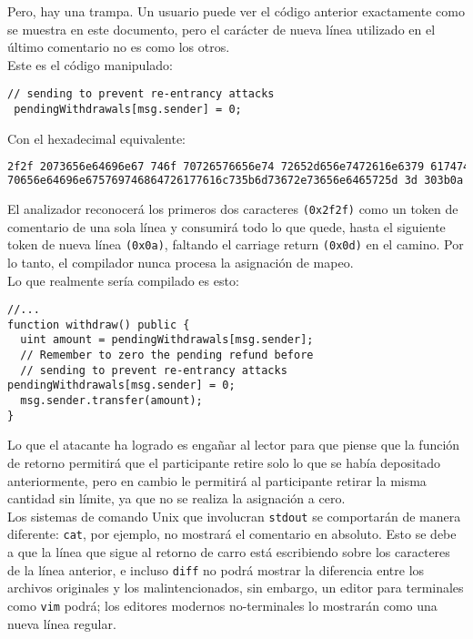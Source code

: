 Pero, hay una trampa. Un usuario puede ver el código anterior exactamente como se muestra en este documento, pero el carácter de nueva línea utilizado en el último comentario no es como los otros.\\

Este es el código manipulado:
\begin{lstlisting}[language=Solidity]
// sending to prevent re-entrancy attacks
 pendingWithdrawals[msg.sender] = 0;
\end{lstlisting}

Con el hexadecimal equivalente:
\begin{lstlisting}[language=bash]
2f2f 2073656e64696e67 746f 70726576656e74 72652d656e7472616e6379 61747461636b730d
70656e64696e675769746864726177616c735b6d73672e73656e6465725d 3d 303b0a
\end{lstlisting}

El analizador reconocerá los primeros dos caracteres \verb|(0x2f2f)| como un token de comentario de una sola línea y consumirá todo lo que quede, hasta el siguiente token de nueva línea \verb|(0x0a)|, faltando el carriage return \verb|(0x0d)| en el camino. Por lo tanto, el compilador nunca procesa la asignación de mapeo.\\

Lo que realmente sería compilado es esto:
\begin{lstlisting}[language=Solidity]
//...
function withdraw() public {
  uint amount = pendingWithdrawals[msg.sender];
  // Remember to zero the pending refund before
  // sending to prevent re-entrancy attacks pendingWithdrawals[msg.sender] = 0;
  msg.sender.transfer(amount);   
}
\end{lstlisting}

Lo que el atacante ha logrado es engañar al lector para que piense que la función de retorno permitirá que el participante retire solo lo que se había depositado anteriormente, pero en cambio le permitirá al participante retirar la misma cantidad sin límite, ya que no se realiza la asignación a cero.\\

Los sistemas de comando Unix que involucran \verb|stdout| se comportarán de manera diferente: \verb|cat|, por ejemplo, no mostrará el comentario en absoluto. Esto se debe a que la línea que sigue al retorno de carro está escribiendo sobre los caracteres de la línea anterior, e incluso \verb|diff| no podrá mostrar la diferencia entre los archivos originales y los malintencionados, sin embargo, un editor para terminales como \verb|vim| podrá; los editores modernos no-terminales lo mostrarán como una nueva línea regular.\\

